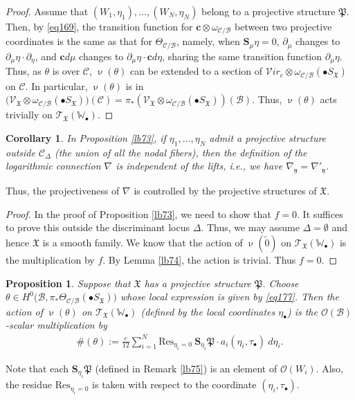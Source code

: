 \documentclass[12pt,a4paper,notitlepage]{report}
\theoremstyle{definition}
\theoremstyle{plain}
\newtheorem{pp}[df]{Proposition}
\newtheorem{co}[df]{Corollary}
\newcommand{\fk}{\mathfrak}
\newcommand{\mc}{\mathcal}
\newcommand{\wtd}{\widetilde}
\newcommand{\Res}{\mathrm{Res}}
\newcommand{\scr}{\mathscr}
\newcommand{\yk}{\mathfrak y}
\newcommand{\SX}{S_{\fk X}}
\newcommand{\blt}{\bullet}
\newcommand{\Wbb}{\mathbb W}
\newcommand{\cbf}{\mathbf c}
\newcommand{\svir}{\mathcal V\!\mathit{ir}}
\newcommand{\Sbf}{\mathbf{S}}
\numberwithin{equation}{section}
\begin{document}
\begin{proof}
Assume that $(W_1,\eta_1),\dots,(W_N,\eta_N)$ belong to a projective structure $\fk P$. Then, by \eqref{eq169}, the transition function for $\cbf \otimes \omega_{\mc C/\mc B}$  between two projective coordinates is the same as that for $\Theta_{\mc C/\mc B}$, namely, when $\Sbf_\mu\eta=0$, $\partial_\mu$ changes to $\partial_\mu\eta\cdot \partial_\eta$, and $\cbf d\mu$ changes to $\partial_\mu\eta\cdot \cbf d\eta$, sharing the same transition function $\partial_\mu\eta$. Thus, as $\theta$ is over $\mc C$, $\upnu(\theta)$ can be extended to a section of $\svir_c\otimes \omega_{\mc C/\mc B}(\blt S_{\fk X})$ on $\mc C$. In particular, $\upnu(\theta)$ is in $\big(\scr V_{\fk X}\otimes \omega_{\mc C/\mc B}(\blt \SX)\big)(\mc C)=\pi_*(\scr V_{\fk X}\otimes \omega_{\mc C/\mc B}(\blt \SX))(\mc B)$. Thus, $\upnu(\theta)$ acts trivially on $\scr T_{\fk X}(\Wbb_\blt)$.
\end{proof}



\begin{co}
In Proposition \ref{lb73},  if $\eta_1,\dots,\eta_N$ admit a projective structure outside  $\mc C_{\Delta}$ (the union of all the nodal fibers), then the definition of the logarithmic connection $\nabla$ is independent of the lifts, i.e., we have $\nabla_\yk=\nabla'_\yk$.
\end{co}

Thus, the projectiveness of $\nabla$ is controlled by the projective structures of $\fk X$.


\begin{proof}
In the proof of Proposition \ref{lb73}, we need to show that $f=0$. It suffices to prove this outside the discriminant locus $\Delta$. Thus, we may assume $\Delta=\emptyset$ and hence $\fk X$ is a smooth family. We know that the action of $\upnu(\wtd 0)$ on $\scr T_{\fk X}(\Wbb_\blt)$ is the multiplication by $f$. By Lemma \ref{lb74}, the action is trivial. Thus $f=0$.
\end{proof}



\begin{pp}\label{lb80}
Suppose that $\fk X$ has a projective structure $\fk P$. Choose $\theta\in H^0\big(\mc B,\pi_*\Theta_{\mc C/\mc B}(\blt S_{\fk X})\big)$ whose local expression is given by \eqref{eq177}. Then the action of $\upnu(\theta)$ on $\scr T_{\fk X}(\Wbb_\blt)$ (defined by the local coordinates $\eta_\blt$) is the $\scr O(\mc B)$-scalar multiplication  by
\begin{align}
\#(\theta):=\frac{c}{12}\sum_{i=1}^N \Res_{\eta_i=0}~ \Sbf_{\eta_i}\fk P\cdot a_i(\eta_i,\tau_\blt)~d\eta_i.\label{eq179}
\end{align}
\end{pp}
Note that each $\Sbf_{\eta_i}\fk P$ (defined in Remark \ref{lb75}) is an element of $\scr O(W_i)$. Also, the residue $\Res_{\eta_i=0}$ is taken with respect to the coordinate $(\eta_i,\tau_\blt)$.
\end{document}
